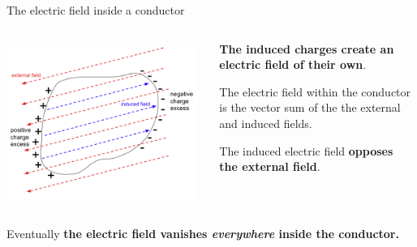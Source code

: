 \begin{frame}{The electric field inside a conductor}
\begin{columns}
  \begin{column}{0.45\textwidth}
      \begin{center}
        \includegraphics[width=0.98\textwidth]{./images/schematics/metal_in_electric_field_3.png}\\
      \end{center}
  \end{column}
  \begin{column}{0.55\textwidth}
  \begin{itemize}
   {\small
   \item {\bf The induced charges create an electric field of their own}.
   \item The electric field within the conductor is the vector sum of the the external and induced fields.
   \item The induced electric field {\bf opposes the external field}.
   }
  \end{itemize}
  \end{column}
\end{columns}

\vspace{0.2cm}
Eventually {\bf the electric field vanishes {\em everywhere} inside the conductor.}\\

\end{frame}

%
%
%

